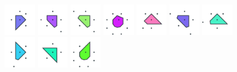 \documentclass[text.tex]{subfiles}
\begin{document}
\begin{figure}[h!]
\includegraphics[width=0.12\textwidth]{img/results/octagon/octagon_100000_(1_0alpha_1)_005.pdf}
\includegraphics[width=0.12\textwidth]{img/results/octagon/octagon_100000_(1_0alpha_1)_006.pdf}
\includegraphics[width=0.12\textwidth]{img/results/octagon/octagon_100000_(1_0alpha_1)_007.pdf}
\includegraphics[width=0.12\textwidth]{img/results/octagon/octagon_100000_(1_0alpha_1)_008.pdf}
\includegraphics[width=0.12\textwidth]{img/results/octagon/octagon_100000_(1_0alpha_1)_009.pdf}
\includegraphics[width=0.12\textwidth]{img/results/octagon/octagon_100000_(1_0alpha_1)_010.pdf}
\includegraphics[width=0.12\textwidth]{img/results/octagon/octagon_100000_(1_0alpha_1)_011.pdf}
\includegraphics[width=0.12\textwidth]{img/results/octagon/octagon_100000_(1_0alpha_1)_012.pdf}
\includegraphics[width=0.12\textwidth]{img/results/octagon/octagon_100000_(1_0alpha_1)_013.pdf}
\includegraphics[width=0.12\textwidth]{img/results/octagon/octagon_100000_(1_0alpha_1)_014.pdf}
\end{figure}
\end{document}
